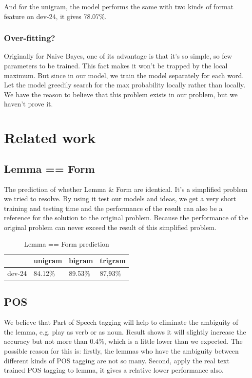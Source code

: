 \documentclass[a4paper]{article}
\begin{document}
And for the unigram, the model performs the same with two kinds of format feature on dev-24, it gives 78.07\%.


\subsubsection{Over-fitting?}
Originally for Naive Bayes, one of its advantage is that it's so simple, so few parameters to be trained. This fact makes it won't be trapped by the local maximum. But since in our model, we train the model separately for each word. Let the model greedily search for the max probability locally rather than locally. We have the reason to believe that this problem exists in our problem, but we haven't prove it.


\section{Related work}
\subsection*{Lemma == Form}
The prediction of whether Lemma \& Form are identical. It's a simplified problem we tried to resolve. By using it test our models and ideas, we get a very short training and testing time and the performance of the result can also be a reference for the solution to the original problem. Because the performance of the original problem can never exceed the result of this simplified problem.

\begin{table}[htp]
\centering
\begin{tabular}{|l|l|l|l|}
\hline
       & unigram & bigram & trigram \\ \hline
dev-24 & 84.12\%   & 89.53\%  & 87,93\%   \\ \hline
\end{tabular}
\caption{Lemma == Form prediction}
\label{tb:lemma_eq_tb}
\end{table}

\subsection*{POS}
We believe that Part of Speech tagging will help to eliminate the ambiguity of the lemma, e.g. play as verb or as noun. Result shows it will slightly increase the accuracy but not more than 0.4\%, which is a little lower than we expected. The possible reason for this is: firstly, the lemmas who have the ambiguity between different kinds of POS tagging are not so many. Second, apply the real text trained POS tagging to lemma, it gives a relative lower performance also.
\end{document}
